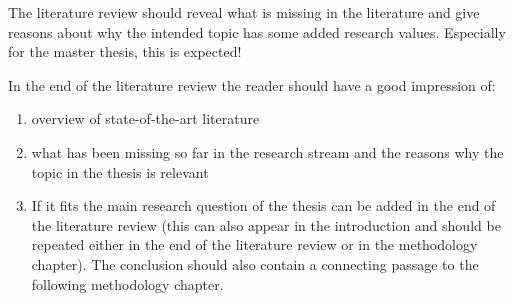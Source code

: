 The literature review should reveal what is missing in the literature and give reasons about why the intended topic has some added research values. Especially for the master thesis, this is expected! 

In the end of the literature review the reader should have a good impression of: 

\begin{enumerate}
    \item overview of state-of-the-art literature
    \item what has been missing so far in the research stream and the reasons why the topic in the thesis is relevant
    \item If it fits the main research question of the thesis can be added in the end of the literature review (this can also appear in the introduction and should be repeated either in the end of the literature review or in the methodology chapter). The conclusion should also contain a connecting passage to the following methodology chapter. 
\end{enumerate}